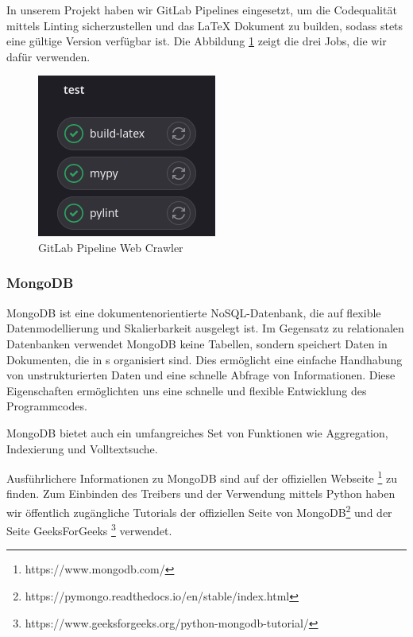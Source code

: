 In unserem Projekt haben wir GitLab Pipelines eingesetzt, um die
Codequalität mittels Linting sicherzustellen und das LaTeX Dokument
zu builden, sodass stets eine gültige Version verfügbar ist.
Die Abbildung \ref{fig:pipeline} zeigt die drei Jobs, die wir dafür verwenden.

\begin{figure}[H]
	\begin{center}
		\includegraphics[width=0.5\columnwidth]{./images/gitlab-pipeline.PNG}
		\caption{GitLab Pipeline Web Crawler}
		\label{fig:pipeline}
	\end{center}
\end{figure}

\subsubsection{MongoDB}\label{mongoDB}

MongoDB ist eine dokumentenorientierte NoSQL-Datenbank, die auf flexible
Datenmodellierung und Skalierbarkeit ausgelegt ist. Im Gegensatz zu
relationalen Datenbanken verwendet MongoDB keine Tabellen, sondern
speichert Daten in Dokumenten, die in s organisiert sind.
Dies ermöglicht eine einfache Handhabung von unstrukturierten Daten
und eine schnelle Abfrage von Informationen. Diese Eigenschaften
ermöglichten uns eine schnelle und flexible Entwicklung des Programmcodes.

MongoDB bietet auch ein umfangreiches Set von Funktionen wie Aggregation,
Indexierung und Volltextsuche.

Ausführlichere Informationen zu MongoDB sind auf der offiziellen Webseite
\footnote{https://www.mongodb.com/} zu finden. Zum Einbinden des Treibers
und der Verwendung mittels Python haben wir öffentlich zugängliche Tutorials
der offiziellen Seite von MongoDB\footnote{https://pymongo.readthedocs.io/en/stable/index.html}
und der Seite GeeksForGeeks \footnote{https://www.geeksforgeeks.org/python-mongodb-tutorial/} verwendet.

